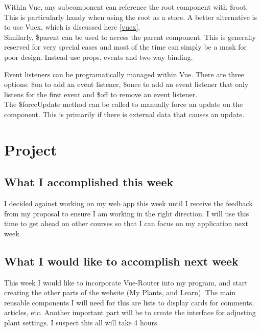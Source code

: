 \documentclass[portfolio.tex]{subfiles}
\begin{document}
					Within Vue, any subcomponent can reference the root component with \$root. This is particularly handy when using the root as a store. A better alternative is to use Vuex, which is discussed here \ref{vuex}.\\



					Similarly, \$parent can be used to access the parent component. This is generally reserved for very special cases and most of the time can simply be a mask for poor design. Instead use props, events and two-way binding.\\

					\vspace{0.5cm}
					\hspace{-1.6cm}

					\vspace{0.5cm}

					Event listeners can be programatically managed within Vue. There are three options: \$on to add an event listener, \$once to add an event listener that only listens for the first event and \$off to remove an event listener.\\

					The \$forceUpdate method can be called to manually force an update on the component. This is primarily if there is external data that causes an update.\\
		\section{Project}
			\subsection{What I accomplished this week}
				I decided against working on my web app this week until I receive the feedback from my proposal to ensure I am  working in the right direction. I will use this time to get ahead on other courses so that I can focus on my application next week.

			\subsection{What I would like to accomplish next week}
				This week I would like to incorporate Vue-Router into my program, and start creating the other parts of the website (My Plants, and Learn). The main reusable components I will need for this are lists to display cards for comments, articles, etc. Another important part will be to create the interface for adjusting plant settings. I suspect this all will take 4 hours.

\pagebreak
\end{document}
